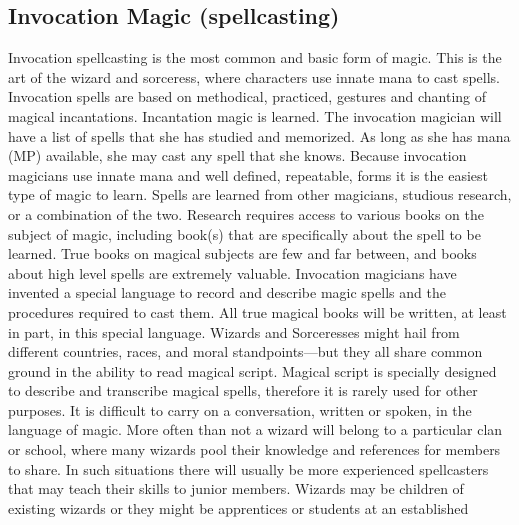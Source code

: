 \documentclass[twoside]{book}
\begin{document}
\subsection{Invocation Magic (spellcasting)}
      Invocation spellcasting is the most common and
               basic form of magic. This is the art of the wizard and
               sorceress, where characters use innate mana to cast
               spells. Invocation spells are based on methodical,
               practiced, gestures and chanting of magical incantations.
                 Incantation magic is learned. The invocation
               magician will have a list of spells that she has studied
               and memorized. As long as she has mana (MP) available, she
               may cast any spell that she knows. Because invocation
               magicians use innate mana and well defined, repeatable,
               forms it is the easiest type of magic to learn.   Spells are learned from other magicians, studious
               research, or a combination of the two. Research requires
               access to various books on the subject of magic, including
               book(s) that are specifically about the spell to be
               learned. True books on magical subjects are few and far
               between, and books about high level spells are extremely
               valuable. Invocation magicians have invented a special
               language to record and describe magic spells and the
               procedures required to cast them. All true magical books
               will be written, at least in part, in this special
               language. Wizards and Sorceresses might hail from
               different countries, races, and moral
               standpoints—but they all share common ground in the
               ability to read magical script. Magical script is
               specially designed to describe and transcribe magical
               spells, therefore it is rarely used for other purposes. It
               is difficult to carry on a conversation, written or
               spoken, in the language of magic.   More often than not a wizard will belong to a
               particular clan or school, where many wizards pool their
               knowledge and references for members to share. In such
               situations there will usually be more experienced
               spellcasters that may teach their skills to junior
               members. Wizards may be children of existing wizards or
               they might be apprentices or students at an established
\end{document}
